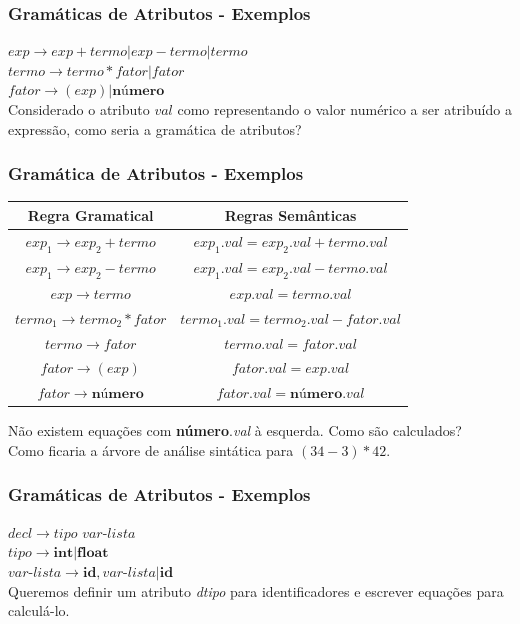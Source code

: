 \documentclass[table]{beamer}
\begin{document}
\begin{frame}
   \frametitle{Gramáticas de Atributos - Exemplos}
   $exp\to exp+termo|exp-termo|termo$ \\
   $termo\to termo*fator|fator$ \\
   $fator\to (exp)|\textbf{número}$ \\
   Considerado o atributo $val$ como representando o valor numérico a ser atribuído a expressão, como seria a gramática de atributos?
\end{frame}

\begin{frame}
   \frametitle{Gramática de Atributos - Exemplos}
   \begin{table}
      \begin{tabular}{cc}
      Regra Gramatical & Regras Semânticas \\
      \hline 
      $exp_{1}\to exp_{2} + termo$ & $exp_{1}.val = exp_{2}.val + termo.val $ \\
      $exp_{1}\to exp_{2} - termo$ & $exp_{1}.val = exp_{2}.val - termo.val $ \\
      $exp\to termo$ & $exp.val = termo.val $ \\
      $termo_{1}\to termo_{2} * fator$ & $termo_{1}.val = termo_{2}.val - fator.val $ \\
      $termo\to fator$ & $termo.val = fator.val $ \\
      $fator\to (exp)$ & $fator.val = exp.val $ \\
      $fator\to \textbf{número}$ & $fator.val = \textbf{número.}val $ \\
      \hline
      \end{tabular}
   \end{table}
   Não existem equações com \textbf{número}.\textit{val} à esquerda. Como são calculados? \\
   Como ficaria a árvore de análise sintática para $(34-3)*42$.
\end{frame}

\begin{frame}
   \frametitle{Gramáticas de Atributos - Exemplos}
   $decl\to\textit{tipo var-lista}$ \\
   $tipo\to \textbf{int}|\textbf{float}$ \\
   $\textit{var-lista} \to \textbf{id},\textit{var-lista} | \textbf{id}$ \\
   Queremos definir um atributo \textit{dtipo} para identificadores e escrever equações para calculá-lo. 
\end{frame}
\end{document}
